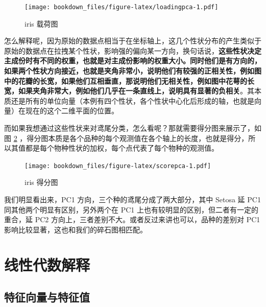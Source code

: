 \documentclass[
]{krantz}
\makeatletter
\newenvironment{Shaded}{\begin{snugshade}}{\end{snugshade}}
\newcommand{\AttributeTok}[1]{\textcolor[rgb]{0.77,0.63,0.00}{#1}}
\newcommand{\ConstantTok}[1]{\textcolor[rgb]{0.00,0.00,0.00}{#1}}
\newcommand{\FunctionTok}[1]{\textcolor[rgb]{0.00,0.00,0.00}{#1}}
\newcommand{\NormalTok}[1]{#1}
\newcommand{\SpecialCharTok}[1]{\textcolor[rgb]{0.00,0.00,0.00}{#1}}
\newenvironment{kframe}{%
\medskip{}
\setlength{\fboxsep}{.8em}
 \def\at@end@of@kframe{}%
 \ifinner\ifhmode%
  \def\at@end@of@kframe{\end{minipage}}%
  \begin{minipage}{\columnwidth}%
 \fi\fi%
 \def\FrameCommand##1{\hskip\@totalleftmargin \hskip-\fboxsep
 \colorbox{shadecolor}{##1}\hskip-\fboxsep
     \hskip-\linewidth \hskip-\@totalleftmargin \hskip\columnwidth}%
 \MakeFramed {\advance\hsize-\width
   \@totalleftmargin\z@ \linewidth\hsize
   \@setminipage}}%
 {\par\unskip\endMakeFramed%
 \at@end@of@kframe}
\renewenvironment{Shaded}{\begin{kframe}}{\end{kframe}}
\makeatother
\begin{document}
\begin{figure}
\centering
\texttt{[image: bookdown\_files/figure-latex/loadingpca-1.pdf]}
\caption{\label{fig:loadingpca}iris 载荷图}
\end{figure}

怎么解释呢，因为原始的数据点相当于在坐标轴上，这几个性状分布的产生类似于原始的数据点在拉拽某个性状，影响强的偏向某一方向，换句话说，\textbf{这些性状决定主成份时有不同的权重，也就是对主成份影响的权重大小。同时他们是有方向的，如果两个性状方向接近，也就是夹角非常小，说明他们有较强的正相关性，例如图中的花瓣的长宽，如果他们互相垂直，那说明他们无相关性，例如图中花萼的长宽，如果夹角非常大，例如他们几乎在一条直线上，说明具有显著的负相关}。其本质还是所有的单位向量（本例有四个性状，各个性状中心化后形成的轴，也就是向量）在现在的这个二维平面的位置。

而如果我想通过这些性状来对鸢尾分类，怎么看呢？那就需要得分图来展示了，如图 \ref{fig:scorepca} ，得分图本质是各个品种的每个观测值在各个轴上的长度，也就是得分，所以其值都是每个物种性状的加权，每个点代表了每个物种的观测值。

\begin{Shaded}
\end{Shaded}

\begin{figure}
\centering
\texttt{[image: bookdown\_files/figure-latex/scorepca-1.pdf]}
\caption{\label{fig:scorepca}iris 得分图}
\end{figure}

我们明显看出来，PC1 方向，三个种的鸢尾分成了两大部分，其中 Setosa 延 PC1 同其他两个明显有区别，另外两个在 PC1 上也有较明显的区别，但二者有一定的重合，延 PC2 方向上，三者差别不大。或者反过来讲也可以，品种的差别对 PC1 影响比较显著，这也和我们的碎石图相匹配。

\hypertarget{alge-pca}{%
\section{线性代数解释}\label{alge-pca}}

\hypertarget{egi-pca}{%
\subsection{特征向量与特征值}\label{egi-pca}}
\end{document}

